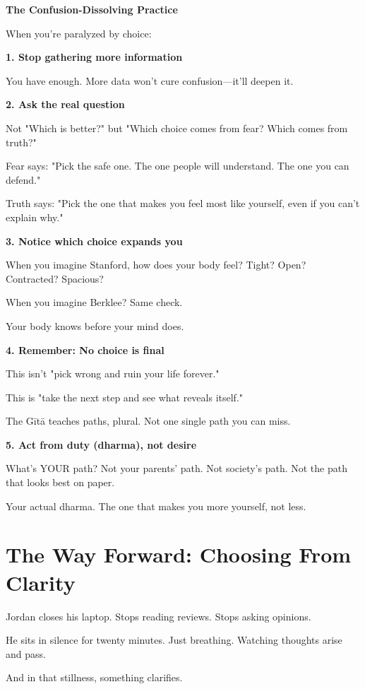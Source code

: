 \documentclass[11pt,twoside]{book}
\begin{document}
\begin{practicebox}
\textbf{The Confusion-Dissolving Practice}

When you're paralyzed by choice:

\textbf{1. Stop gathering more information}

You have enough. More data won't cure confusion—it'll deepen it.

\textbf{2. Ask the real question}

Not "Which is better?" but "Which choice comes from fear? Which comes from truth?"

Fear says: "Pick the safe one. The one people will understand. The one you can defend."

Truth says: "Pick the one that makes you feel most like yourself, even if you can't explain why."

\textbf{3. Notice which choice expands you}

When you imagine Stanford, how does your body feel? Tight? Open? Contracted? Spacious?

When you imagine Berklee? Same check.

Your body knows before your mind does.

\textbf{4. Remember: No choice is final}

This isn't "pick wrong and ruin your life forever."

This is "take the next step and see what reveals itself."

The Gītā teaches paths, plural. Not one single path you can miss.

\textbf{5. Act from duty (dharma), not desire}

What's YOUR path? Not your parents' path. Not society's path. Not the path that looks best on paper.

Your actual dharma. The one that makes you more yourself, not less.
\end{practicebox}

\section*{The Way Forward: Choosing From Clarity}

Jordan closes his laptop. Stops reading reviews. Stops asking opinions.

He sits in silence for twenty minutes. Just breathing. Watching thoughts arise and pass.

And in that stillness, something clarifies.
\end{document}
